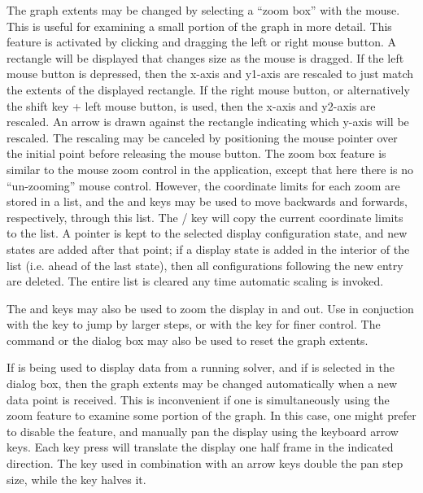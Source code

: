 The graph extents may be changed by selecting a ``zoom box'' with the
mouse.  This is useful for examining a small portion of the graph in
more detail.  This feature is activated by clicking and dragging the
left or right mouse button.  A rectangle will be displayed that changes
size as the mouse is dragged.  If the left mouse button is depressed,
then the x-axis and y1-axis are rescaled to just match the extents of
the displayed rectangle.  If the right mouse button, or alternatively
the shift key + left mouse button, is used, then the x-axis and y2-axis
are rescaled.  An arrow is drawn against the rectangle indicating which
y-axis will be rescaled.  The rescaling may be canceled by positioning
the mouse pointer over the initial point before releasing the mouse
button.  The zoom box feature is similar to the mouse zoom control in
the  application, except
that here there is no ``un-zooming'' mouse control.  However, the
coordinate limits for each zoom are stored in a list, and the 
and  keys may be used to move backwards and forwards,
respectively, through this list.  The / key will
copy the current coordinate limits to the list.  A pointer is kept to
the selected display configuration state, and new states are added after
that point; if a display state is added in the interior of the list
(i.e. ahead of the last state), then all configurations following the
new entry are deleted.  The entire list is cleared any time automatic
scaling is invoked.

The  and  keys may also be used to zoom the
display in and out.  Use in conjuction with the  key to jump
by larger steps, or with the  key for finer control.  The
 command or the
 dialog box may also be used to reset the
graph extents.

If  is being used to display data from a running solver,
and if  is selected in the
 dialog box, then the graph extents
may be changed automatically when a new data point is received.  This is
inconvenient if one is simultaneously using the zoom feature to examine
some portion of the graph.  In this case, one might prefer to disable
the  feature, and manually pan the display using the
keyboard arrow keys.  Each key press will translate the display one half
frame in the indicated direction.  The  key used in
combination with an arrow keys double the pan step size, while the
 key halves it.

